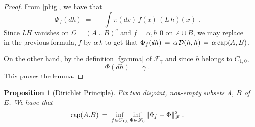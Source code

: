 \documentclass[reqno]{amsart}
\newtheorem{proposition}[theorem]{Proposition}
\newcommand{\mc}[1]{{\mathcal #1}}
\newcommand{\ms}[1]{{\mathscr #1}}
\newcommand{\<}{\langle}
\renewcommand{\>}{\rangle}
\renewcommand{\Cap}{{\rm cap}}
\begin{document}
\begin{proof}
From \eqref{phig}, we have that
\begin{equation*}
\Phi_f(dh) \;=\; -\, \int \pi(dx)\, f(x)\, (L \, h)(x) \;.
\end{equation*}
Since $LH$ vanishes on $\Omega = (A\cup B)^c$ and $f= \alpha, h$ $0$ on
$A\cup B$, we may replace in the previous formula, $f$ by $\alpha\, h$
to get that $\Phi_f(dh) \,=\, \alpha \, \mc D(h,h) \,=\,  \alpha \, \Cap(A,B)$.

On the other hand, by the definition \eqref{fgamma} of $\ms F_\gamma$
and since $h$ belongs to $C_{1,0}$,
\begin{equation*}
\Phi (dh) \;=\; \gamma\;.
\end{equation*}
This proves the lemma.
\end{proof}

\begin{proposition}[Dirichlet Principle]
\label{prop1}
Fix two disjoint, non-empty subsets $A$, $B$ of $E$. We have that
\begin{equation*}
\Cap(A.B) \;=\; \inf_{f\in C_{1,0}} \inf_{\Phi\in \ms F_0} 
\|\Phi_f-\Phi\|_{\ms F}^2 \;.
\end{equation*}
\end{proposition}
\end{document}
